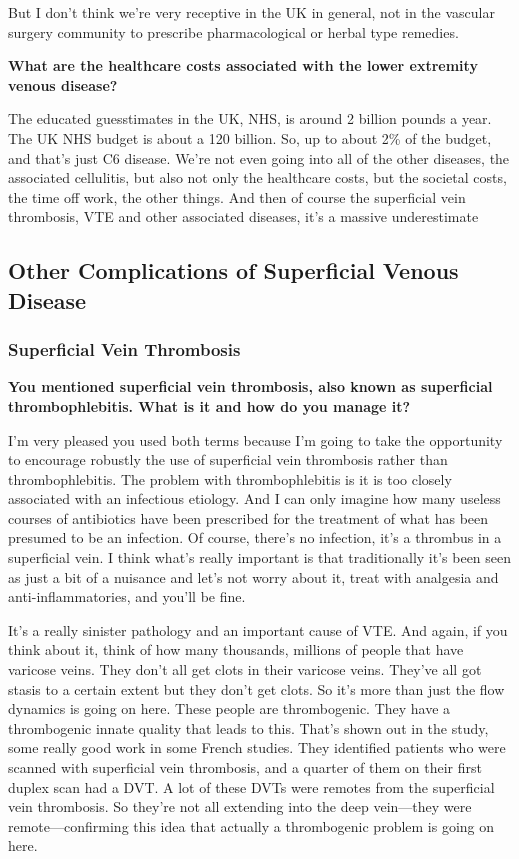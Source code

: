 \documentclass[
]{book}
\begin{document}
But I don't think we're very receptive in the UK in general, not in the
vascular surgery community to prescribe pharmacological or herbal type
remedies.

\textbf{What are the healthcare costs associated with the lower extremity
venous disease?}

The educated guesstimates in the UK, NHS, is around 2 billion pounds a
year. The UK NHS budget is about a 120 billion. So, up to about 2\% of
the budget, and that's just C6 disease. We're not even going into all of
the other diseases, the associated cellulitis, but also not only the
healthcare costs, but the societal costs, the time off work, the other
things. And then of course the superficial vein thrombosis, VTE and
other associated diseases, it's a massive underestimate

\hypertarget{other-complications-of-superficial-venous-disease}{%
\subsection{Other Complications of Superficial Venous Disease}\label{other-complications-of-superficial-venous-disease}}

\hypertarget{superficial-vein-thrombosis}{%
\subsubsection{Superficial Vein Thrombosis}\label{superficial-vein-thrombosis}}

\textbf{You mentioned superficial vein thrombosis, also known as superficial
thrombophlebitis. What is it and how do you manage it?}

I'm very pleased you used both terms because I'm going to take the
opportunity to encourage robustly the use of superficial vein thrombosis
rather than thrombophlebitis. The problem with thrombophlebitis is it is
too closely associated with an infectious etiology. And I can only
imagine how many useless courses of antibiotics have been prescribed for
the treatment of what has been presumed to be an infection. Of course,
there's no infection, it's a thrombus in a superficial vein. I think
what's really important is that traditionally it's been seen as just a
bit of a nuisance and let's not worry about it, treat with analgesia and
anti-inflammatories, and you'll be fine.

It's a really sinister pathology and an important cause of VTE. And
again, if you think about it, think of how many thousands, millions of
people that have varicose veins. They don't all get clots in their
varicose veins. They've all got stasis to a certain extent but they
don't get clots. So it's more than just the flow dynamics is going on
here. These people are thrombogenic. They have a thrombogenic innate
quality that leads to this. That's shown out in the study, some really
good work in some French studies. They identified patients who were
scanned with superficial vein thrombosis, and a quarter of them on their
first duplex scan had a DVT. A lot of these DVTs were remotes from the
superficial vein thrombosis. So they're not all extending into the deep
vein---they were remote---confirming this idea that actually a
thrombogenic problem is going on here.
\end{document}
